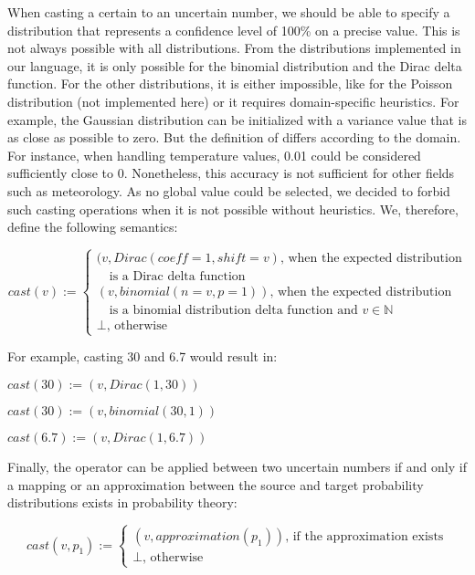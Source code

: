 When casting a certain to an uncertain number, we should be able to specify a distribution that represents a confidence level of 100\% on a precise value.
This is not always possible with all distributions.
From the distributions implemented in our language, it is only possible for the binomial distribution and the Dirac delta function.
For the other distributions, it is either impossible, like for the Poisson distribution (not implemented here) or it requires domain-specific heuristics.
For example, the Gaussian distribution can be initialized with a variance value that is as close as possible to zero.
But the definition of  differs according to the domain. 
For instance, when handling temperature values, 0.01 could be considered sufficiently close to 0.
Nonetheless, this accuracy is not sufficient for other fields such as meteorology.
As no global value could be selected, we decided to forbid such casting operations when it is not possible without heuristics.
We, therefore, define the following semantics:

$$cast(v) := \begin{cases}
						(v, Dirac(coeff=1, shift=v) \text{, when the expected distribution} \\
						\text{~~ is a Dirac delta function}\\
						(v, binomial(n=v, p=1)) \text{, when the expected distribution}\\
						\text{~~ is a binomial distribution delta function and $v \in \mathds{N}$}\\
						\perp \text{, otherwise}
					\end{cases}$$

For example, casting 30 and 6.7 would result in:
\begin{itemize*}
	\item[] $cast(30) := (v, Dirac(1, 30))$
	\item[] $cast(30) := (v, binomial(30, 1))$
	\item[] $cast(6.7) := (v, Dirac(1, 6.7))$
\end{itemize*}

Finally, the operator can be applied between two uncertain numbers if and only if a mapping or an approximation  between the source and target probability distributions exists in probability theory:

$$cast(v, p_1) := \begin{cases}
 								(v, approximation(p_1)) \text{, if the approximation exists}\\
 								\perp \text{, otherwise}
 							\end{cases}$$

